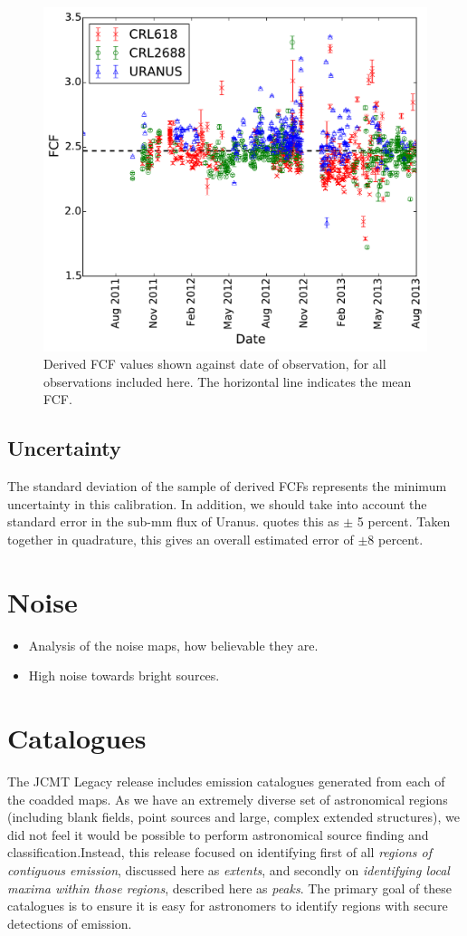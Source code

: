 \documentclass[usenatbib]{mnras}
\begin{document}
\begin{figure}
  \centering
  \includegraphics[width=0.7\linewidth]{Legacy_calibration_vsdate}
  \caption{Derived FCF values shown against date of observation, for
    all observations included here. The horizontal line indicates the mean FCF.}
  \label{fig:calibvstime}
\end{figure}

\subsection{Uncertainty}

The standard deviation of the sample of derived FCFs represents the
minimum uncertainty in this calibration. In addition, we should take
into account the standard error in the sub-mm flux of
Uranus. \citet{Dempsey2013} quotes this as $\pm$ 5 percent. Taken
together in quadrature, this gives an overall estimated error of
$\pm$8 percent.



\section{Noise}
\begin{itemize}
\item Analysis of the noise maps, how believable they are.
\item High noise towards bright sources.
\end{itemize}


\section{Catalogues}
The JCMT Legacy release includes emission catalogues generated from
each of the coadded maps. As we have an extremely diverse set of
astronomical regions (including blank fields, point sources and large,
complex extended structures), we did not feel it would be possible to
perform astronomical source finding and classification.Instead, this
release focused on identifying first of all \emph{regions of
  contiguous emission}, discussed here as \emph{extents}, and secondly
on \emph{identifying local maxima within those regions}, described
here as \emph{peaks}. The primary goal of these catalogues is to
ensure it is easy for astronomers to identify regions with secure
detections of emission.
\end{document}
